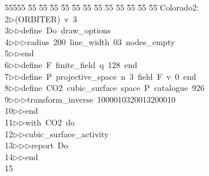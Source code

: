 %
%
\begin{tabbing}
55555 \= 55 \= 55 \= 55 \= 55 \= 55 \= 55 \= 55 \= 55 \= 55 \= 55 \= 55 \= 55 \= \>Colorado2:\\[0pt]
2\>$\triangleright$\>(ORBITER)\ v\ 3\ \\[0pt]
3\>$\triangleright$\>$\triangleright$\>define\ Do\ draw\_options\ \\[0pt]
4\>$\triangleright$\>$\triangleright$\>$\triangleright$\>radius\ 200\ line\_width\ 03\ nodes\_empty\ \\[0pt]
5\>$\triangleright$\>$\triangleright$\>end\ \\[0pt]
6\>$\triangleright$\>$\triangleright$\>define\ F\ finite\_field\ q\ 128\ end\ \\[0pt]
7\>$\triangleright$\>$\triangleright$\>define\ P\ projective\_space\ n\ 3\ field\ F\ v\ 0\ end\ \\[0pt]
8\>$\triangleright$\>$\triangleright$\>define\ CO2\ cubic\_surface\ space\ P\ catalogue\ 926\ \\[0pt]
9\>$\triangleright$\>$\triangleright$\>$\triangleright$\>transform\_inverse\ 1000010320013200010\ \\[0pt]
10\>$\triangleright$\>$\triangleright$\>end\ \\[0pt]
11\>$\triangleright$\>$\triangleright$\>with\ CO2\ do\ \\[0pt]
12\>$\triangleright$\>$\triangleright$\>cubic\_surface\_activity\ \\[0pt]
13\>$\triangleright$\>$\triangleright$\>$\triangleright$\>report\ Do\ \\[0pt]
14\>$\triangleright$\>$\triangleright$\>end\\[0pt]
15\>\end{tabbing}
